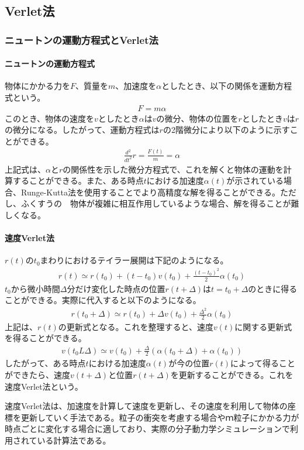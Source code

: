 \documentclass[dvipdfmx]{jsarticle}
\begin{document}
\subsection{Verlet法}
\subsubsection{ニュートンの運動方程式とVerlet法}
\paragraph{ニュートンの運動方程式}
物体にかかる力を$F$、質量を$m$、加速度を$\alpha$としたとき、以下の関係を運動方程式という。
\begin{gather*}
  F = m\alpha
\end{gather*}
このとき、物体の速度を$v$としたとき$\alpha$は$v$の微分、物体の位置を$r$としたとき$v$は$r$の微分になる。したがって、運動方程式は$r$の2階微分により以下のように示すことができる。
\begin{gather*}
  \frac{d^{2}}{dt^{2}}r = \frac{F(t)}{m} = \alpha
\end{gather*}
上記式は、$\alpha$と$r$の関係性を示した微分方程式で、これを解くと物体の運動を計算することができる。また、ある時点$t$における加速度$\alpha(t)$が示されている場合、Runge-Kutta法を使用することでより高精度な解を得ることができる。ただし、ふくすうの　物体が複雑に相互作用しているような場合、解を得ることが難しくなる。\par
\paragraph{速度Verlet法}
$r(t)$の$t_{0}$まわりにおけるテイラー展開は下記のようになる。
\begin{gather*}
  r(t)\simeq r(t_{0}) + (t-t_{0})v(t_{0}) + \frac{(t-t_{0})^{2}}{2}\alpha(t_{0})
\end{gather*}
$t_{0}$から微小時間$\Delta$分だけ変化した時点の位置$r(t+\Delta)$は$t = t_{0} + \Delta$のときに得ることができる。実際に代入すると以下のようになる。
\begin{gather*}
  r(t_{0} + \Delta)\simeq r(t_{0}) + \Delta v(t_{0}) + \frac{\Delta^{2}}{2}\alpha(t_{0})
\end{gather*}
上記は、$r(t)$の更新式となる。これを整理すると、速度$v(t)$に関する更新式を得ることができる。
\begin{gather*}
  v(t_{0} L \Delta)\simeq v(t_{0}) + \frac{\Delta}{2}(\alpha (t_{0}+\Delta) + \alpha(t_{0}))
\end{gather*}
したがって、ある時点$t$における加速度$\alpha(t)$が今の位置$r(t)$によって得ることができたら、速度$v(t + \Delta)$と位置$r(t + \Delta)$を更新することができる。これを速度Verlet法という。\par
速度Verlet法は、加速度を計算して速度を更新し、その速度を利用して物体の座標を更新していく手法である。粒子の衝突を考慮する場合やｍ粒子にかかる力が時点ごとに変化する場合に適しており、実際の分子動力学シミュレーションで利用されている計算法である。
\end{document}
